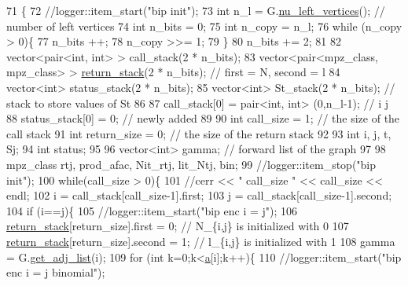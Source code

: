 \begin{DoxyCode}
71                                                                          \{
72   \textcolor{comment}{//logger::item\_start("bip init");}
73   \textcolor{keywordtype}{int} n\_l = G.\hyperlink{classb__graph_a5e71d5c97f2501b0b93c17146cf7e68e}{nu\_left\_vertices}(); \textcolor{comment}{// number of left vertices}
74   \textcolor{keywordtype}{int} n\_bits = 0;
75   \textcolor{keywordtype}{int} n\_copy = n\_l;
76   \textcolor{keywordflow}{while} (n\_copy > 0)\{
77     n\_bits ++;
78     n\_copy >>= 1;
79   \}
80   n\_bits += 2;
81 
82   vector<pair<int, int> > call\_stack(2 * n\_bits);
83   vector<pair<mpz\_class, mpz\_class> > \hyperlink{namespacehelper__vars_a6d2100c373830cacd232319a9958652d}{return\_stack}(2 * n\_bits); \textcolor{comment}{// first = N, second = l}
84   vector<int> status\_stack(2 * n\_bits);
85   vector<int> St\_stack(2 * n\_bits); \textcolor{comment}{// stack to store values of St}
86  
87   call\_stack[0] = pair<int, int> (0,n\_l-1); \textcolor{comment}{// i j }
88   status\_stack[0] = 0; \textcolor{comment}{// newly added}
89  
90   \textcolor{keywordtype}{int} call\_size = 1; \textcolor{comment}{// the size of the call stack}
91   \textcolor{keywordtype}{int} return\_size = 0; \textcolor{comment}{// the size of the return stack}
92 
93   \textcolor{keywordtype}{int} i, j, t, Sj;
94   \textcolor{keywordtype}{int} status;
95  
96   vector<int> gamma; \textcolor{comment}{// forward list  of the graph}
97 
98   mpz\_class rtj, prod\_afac, Nit\_rtj, lit\_Ntj, bin;
99   \textcolor{comment}{//logger::item\_stop("bip init");}
100   \textcolor{keywordflow}{while}(call\_size > 0)\{
101     \textcolor{comment}{//cerr << " call\_size " << call\_size << endl;}
102     i = call\_stack[call\_size-1].first;
103     j = call\_stack[call\_size-1].second;
104     \textcolor{keywordflow}{if} (i==j)\{
105       \textcolor{comment}{//logger::item\_start("bip enc i = j");}
106       \hyperlink{namespacehelper__vars_a6d2100c373830cacd232319a9958652d}{return\_stack}[return\_size].first = 0; \textcolor{comment}{// N\_\{i,j\} is initialized with 0}
107       \hyperlink{namespacehelper__vars_a6d2100c373830cacd232319a9958652d}{return\_stack}[return\_size].second = 1; \textcolor{comment}{// l\_\{i,j\} is initialized with 1}
108       gamma = G.\hyperlink{classb__graph_aa81c7179b9c6cb4986c4b41e84a85799}{get\_adj\_list}(i);
109       \textcolor{keywordflow}{for} (\textcolor{keywordtype}{int} k=0;k<\hyperlink{classb__graph__encoder_afd22d167f495cd85b41397f337c377c2}{a}[i];k++)\{
110         \textcolor{comment}{//logger::item\_start("bip enc i = j binomial");}

\end{DoxyCode}
